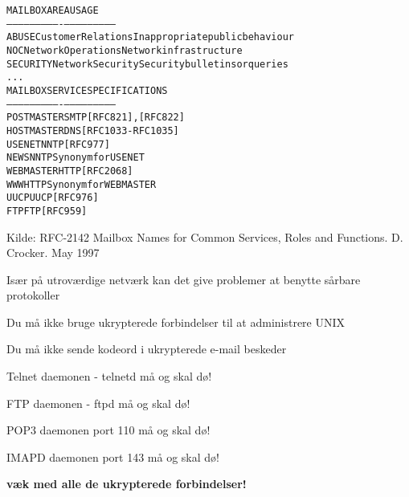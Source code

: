 \documentclass[Screen16to9,17pt]{foils}
\begin{document}

\begin{alltt}\small
MAILBOX       AREA                USAGE
-----------   ----------------    ---------------------------
ABUSE         Customer Relations  Inappropriate public behaviour
NOC           Network Operations  Network infrastructure
SECURITY      Network Security    Security bulletins or queries
...
MAILBOX       SERVICE             SPECIFICATIONS
-----------   ----------------    ---------------------------
POSTMASTER    SMTP                [RFC821], [RFC822]
HOSTMASTER    DNS                 [RFC1033-RFC1035]
USENET        NNTP                [RFC977]
NEWS          NNTP                Synonym for USENET
WEBMASTER     HTTP                [RFC 2068]
WWW           HTTP                Synonym for WEBMASTER
UUCP          UUCP                [RFC976]
FTP           FTP                 [RFC959]
\end{alltt}

Kilde:
RFC-2142 Mailbox Names for Common Services, Roles and Functions. D.
Crocker. May 1997



\begin{list1}
\item Især på utroværdige netværk kan det give problemer at benytte
  sårbare protokoller
\end{list1}


\begin{list1}
\item Du må ikke bruge ukrypterede forbindelser til at administrere
  UNIX
\item Du må ikke sende kodeord i ukrypterede e-mail beskeder
\end{list1}

\centerline{\hlkbig Telnet daemonen - telnetd må og skal dø!}

\pause
\centerline{\hlkbig FTP daemonen - ftpd må og skal dø!}

\pause
\centerline{\hlkbig POP3 daemonen port 110 må og skal dø!}

\pause
\centerline{\hlkbig IMAPD daemonen port 143 må og skal dø!}

\pause
\vskip 1cm
\centerline{\hlkbig\bf væk med alle de ukrypterede forbindelser!}


\end{document}
